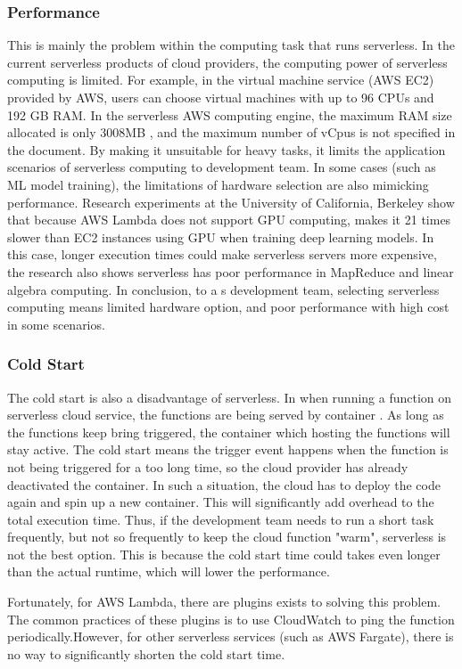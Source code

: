 \subsubsection{Performance}
\label{servlesslimitationPer}
This is mainly the problem within the computing task that runs serverless. In the current serverless products of cloud providers, the computing power of serverless computing is limited. 
For example, in the virtual machine service (AWS EC2) provided by AWS, users can choose virtual machines with up to 96 CPUs and 192 GB RAM. In the serverless AWS computing engine, the maximum RAM size allocated is only 3008MB \cite{AWSLambd13:online}, and the maximum number of vCpus is not specified in the document.
By making it unsuitable for heavy tasks, it limits the application scenarios of serverless computing to development team.
In some cases (such as ML model training), the limitations of hardware selection are also mimicking performance. Research experiments \cite{jonas2019cloud} at the University of California, Berkeley show that because AWS Lambda does not support GPU computing, makes it 21 times slower than EC2 instances using GPU \cite{hellerstein2018serverless} when training deep learning models. In this case, longer execution times could make serverless servers more expensive, the research also shows serverless has poor performance in MapReduce and linear
algebra computing. In conclusion, to a s development team, selecting serverless computing means limited hardware option, and poor performance with high cost in some scenarios.
\subsubsection{Cold Start}
The cold start is also a disadvantage of serverless. In when running a function on serverless cloud service, the functions are being served by container \cite{KeepingF68:online}. As long as the functions keep bring triggered, the container which hosting the functions will stay active. The cold start means the trigger event happens when the function is not being triggered for a too long time, so the cloud provider has already deactivated the container. In such a situation, the cloud has to deploy the code again and spin up a new container. This will significantly add overhead to the total execution time. 
Thus, if the development team needs to run a short task frequently, but not so frequently to keep the cloud function "warm", serverless is not the best option. This is because the cold start time could takes even longer than the actual runtime, which will lower the performance. 
\par
Fortunately, for AWS Lambda, there are plugins exists to solving this problem. The common practices of these plugins is to use CloudWatch to ping the function periodically.However, for other serverless services (such as AWS Fargate), there is no way to significantly shorten the cold start time.
